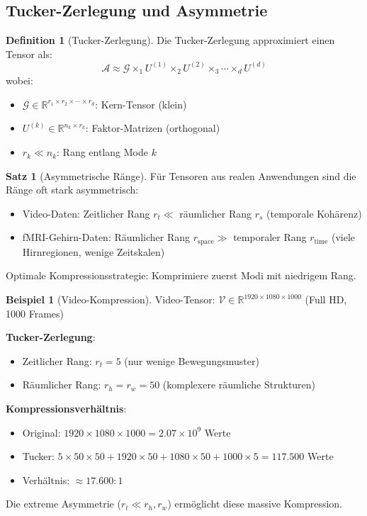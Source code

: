 ﻿\documentclass[a4paper,12pt]{report}
\theoremstyle{definition}
\newtheorem{definition}{Definition}
\newtheorem{beispiel}{Beispiel}
\newtheorem{satz}{Satz}
\begin{document}
	\subsection{Tucker-Zerlegung und Asymmetrie}
	
	\begin{definition}[Tucker-Zerlegung]
		Die Tucker-Zerlegung approximiert einen Tensor als:
		\[
		\mathcal{A} \approx \mathcal{G} \times_1 U^{(1)} \times_2 U^{(2)} \times_3 \cdots \times_d U^{(d)}
		\]
		wobei:
		\begin{itemize}
			\item $\mathcal{G} \in \mathbb{R}^{r_1 \times r_2 \times \cdots \times r_d}$: Kern-Tensor (klein)
			\item $U^{(k)} \in \mathbb{R}^{n_k \times r_k}$: Faktor-Matrizen (orthogonal)
			\item $r_k \ll n_k$: Rang entlang Mode $k$
		\end{itemize}
	\end{definition}
	
	\begin{satz}[Asymmetrische Ränge]
		Für Tensoren aus realen Anwendungen sind die Ränge oft stark asymmetrisch:
		\begin{itemize}
			\item Video-Daten: Zeitlicher Rang $r_t \ll$ räumlicher Rang $r_s$ (temporale Kohärenz)
			\item fMRI-Gehirn-Daten: Räumlicher Rang $r_{\text{space}} \gg$ temporaler Rang $r_{\text{time}}$ (viele Hirnregionen, wenige Zeitskalen)
		\end{itemize}
		
		Optimale Kompressionsstrategie: Komprimiere zuerst Modi mit niedrigem Rang.
	\end{satz}
	
	\begin{beispiel}[Video-Kompression]
		Video-Tensor: $\mathcal{V} \in \mathbb{R}^{1920 \times 1080 \times 1000}$ (Full HD, 1000 Frames)
		
		\textbf{Tucker-Zerlegung}:
		\begin{itemize}
			\item Zeitlicher Rang: $r_t = 5$ (nur wenige Bewegungsmuster)
			\item Räumlicher Rang: $r_h = r_w = 50$ (komplexere räumliche Strukturen)
		\end{itemize}
		
		\textbf{Kompressionsverhältnis}:
		\begin{itemize}
			\item Original: $1920 \times 1080 \times 1000 = 2.07 \times 10^9$ Werte
			\item Tucker: $5 \times 50 \times 50 + 1920 \times 50 + 1080 \times 50 + 1000 \times 5 = 117.500$ Werte
			\item Verhältnis: $\approx 17.600:1$
		\end{itemize}
		
		Die extreme Asymmetrie ($r_t \ll r_h, r_w$) ermöglicht diese massive Kompression.
	\end{beispiel}
	
\end{document}
